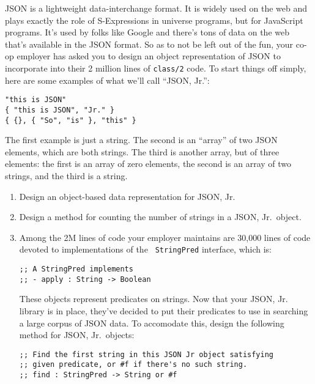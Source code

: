 \documentclass[12pt]{article}                   %
\def\pts#1{\marginpar{\footnotesize \raggedright  \fbox{#1 {\sc Points}}}}
\begin{document}
\vfill\thispagestyle{empty}
\newpage

\begin{problem} \pts{??}

JSON is a lightweight data-interchange format.  It is widely used on
the web and plays exactly the role of S-Expressions in universe
programs, but for JavaScript programs.  It's used by folks like Google
and there's tons of data on the web that's available in the JSON
format.  So as to not be left out of the fun, your co-op employer has
asked you to design an object representation of JSON to incorporate
into their 2 million lines of {\tt class/2} code.  To start things off
simply, here are some examples of what we'll call ``JSON, Jr.'':

\begin{verbatim}
"this is JSON"
{ "this is JSON", "Jr." }
{ {}, { "So", "is" }, "this" }
\end{verbatim}
The first example is just a string.  The second is an ``array'' of two
JSON elements, which are both strings.  The third is another array,
but of three elements: the first is an array of zero elements, the
second is an array of two strings, and the third is a string.

\begin{enumerate}
\item Design an object-based data representation for JSON, Jr.
\newpage
\item Design a method for counting the number of strings in a JSON,
  Jr.~object.
\newpage
\item Among the 2M lines of code your employer maintains are 30,000
  lines of code devoted to implementations of the {\tt
    StringPred} interface, which is:
\begin{verbatim}
;; A StringPred implements
;; - apply : String -> Boolean
\end{verbatim}
These objects represent predicates on strings.  Now that your JSON,
Jr. library is in place, they've decided to put their predicates to
use in searching a large corpus of JSON data.  To accomodate this,
design the following method for JSON, Jr.~objects:
\begin{verbatim}
;; Find the first string in this JSON Jr object satisfying
;; given predicate, or #f if there's no such string.
;; find : StringPred -> String or #f
\end{verbatim}
\end{enumerate}

\end{problem}
\end{document}

